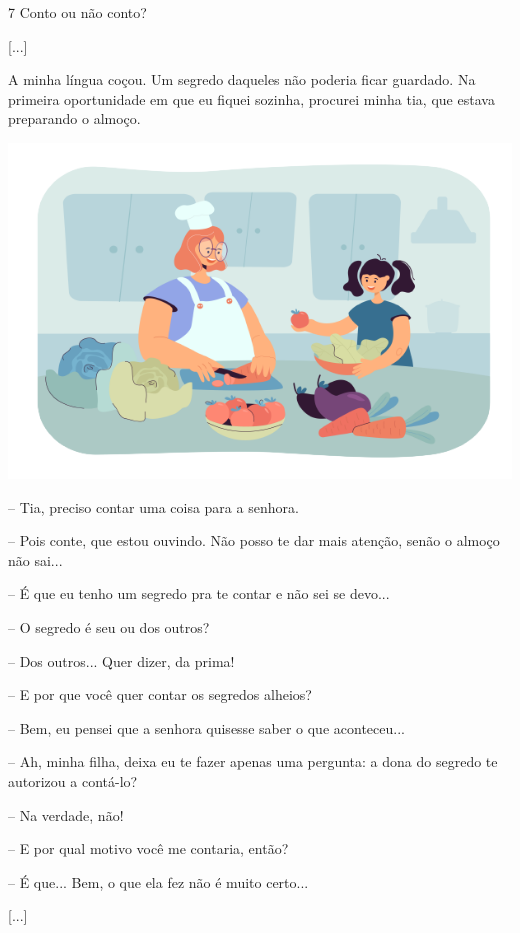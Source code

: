 \num{7} Conto ou não conto?

\begin{myquote}
{[}...{]}

A minha língua coçou. Um segredo daqueles não poderia ficar guardado. Na
primeira oportunidade em que eu fiquei sozinha, procurei minha tia, que
estava preparando o almoço.

\begin{center}
\includegraphics[width=\textwidth]{./media/image23t.png}
\end{center}

-- Tia, preciso contar uma coisa para a senhora.

-- Pois conte, que estou ouvindo. Não posso te dar mais atenção, senão o
almoço não sai...

-- É que eu tenho um segredo pra te contar e não sei se devo...

-- O segredo é seu ou dos outros?

-- Dos outros... Quer dizer, da prima!

-- E por que você quer contar os segredos alheios?

-- Bem, eu pensei que a senhora quisesse saber o que aconteceu...

-- Ah, minha filha, deixa eu te fazer apenas uma pergunta: a dona do
segredo te autorizou a contá-lo?

-- Na verdade, não!

-- E por qual motivo você me contaria, então?

-- É que... Bem, o que ela fez não é muito certo...

{[}...{]}

\end{myquote}

